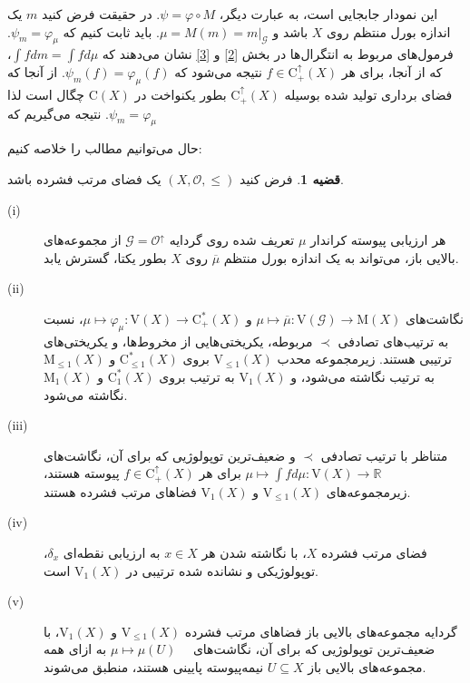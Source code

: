 \documentclass[12pt,a4paper]{article}
\theoremstyle{definition}
\theoremstyle{theorem}
\newtheorem{theorem}[definition]{قضیه}
\theoremstyle{definition}
\newcommand{\bR}{\mathbb{R}}
\newcommand{\cO}{\mathcal{O}}
\newcommand{\cG}{\mathcal{G}}
\newcommand{\rM}{\mathrm{M}}
\newcommand{\rC}{\mathrm{C}}
\begin{document}
این نمودار جابجایی است،  به عبارت دیگر، 
$ \psi=\varphi\circ M $.  در حقیقت فرض کنید 
$ m $
یک اندازه بورل منتظم روی 
$ X $
باشد و
$ \mu=M(m)=m|_{\cG} $.  باید ثابت کنیم که 
$ \psi_{m}=\varphi_{\mu} $.  فرمول‌های مربوط به انتگرال‌ها در بخش
\ref{2}
و
\ref{3}
نشان می‌دهند که
$ \int{f}dm=\int{f}d\mu $،  که از آنجا،  برای هر
$ f\in \rC_{+}^{\uparrow}(X) $
نتیجه می‌شود که
$ \psi_{m}(f)=\varphi_{\mu}(f) $.   از آنجا که فضای برداری تولید شده بوسیله 
$ \rC_{+}^{\uparrow}(X) $
بطور یکنواخت در 
$ \rC(X) $
چگال است لذا نتیجه می‌گیریم که 
$. \psi_{m}=\varphi_{\mu} $


حال می‌توانیم مطالب را خلاصه کنیم:
\begin{theorem}\label{5.4} 
فرض کنید 
$ (X,\cO,\leq) $
یک فضای مرتب فشرده باشد.  
\begin{description}
\item[(i)]
هر ارزیابی پیوسته کراندار 
$ \mu $
تعریف شده روی گردایه 
$ \cG=\cO^{\uparrow} $
از مجموعه‌های بالایی باز،  می‌تواند به یک اندازه بورل منتظم 
$ \overline{\mu} $
روی 
$ X $
بطور یکتا،  گسترش یابد.
\item[(ii)]
نگاشت‌های 
$ \mu\mapsto \overline{\mu}:\mathrm{V}(\cG)\rightarrow \rM(X) $
و
$ \mu\mapsto \varphi_{\mu}: \mathrm{V}(X)\rightarrow \rC_{+}^{*}(X) $،  نسبت به ترتیب‌های تصادفی 
$ \prec $
مربوطه،  یکریختی‌هایی از مخروط‌ها، و یکریختی‌های ترتیبی هستند.   زیرمجموعه محدب 
$ \mathrm{V}_{\leq 1}(X) $
بروی 
$ \rC_{\leq 1}^{*}(X) $
و
$ \rM_{\leq 1}(X) $
 به ترتیب نگاشته می‌شود،  و 
$ \mathrm{V}_{ 1}(X) $
به ترتیب بروی 
$ \rC_{ 1}^{*}(X) $
و
$ \rM_{ 1}(X) $
 نگاشته می‌شود.
\item[(iii)]
متناظر با ترتیب تصادفی  
$ \prec $
و ضعیف‌ترین توپولوژیی که برای آن،  نگاشت‌های
\linebreak
$ \mu\mapsto \int{f}d\mu: \mathrm{V}(X)\rightarrow \bR$
برای هر 
$ f\in  \rC_{ +}^{\uparrow}(X) $
پیوسته هستند،  زیرمجموعه‌های 
$ \mathrm{V}_{\leq 1}(X) $
و
$ \mathrm{V}_{ 1}(X) $
فضاهای مرتب فشرده هستند. 
\item[(iv)]
فضای مرتب فشرده 
$ X $،  با نگاشته‌ شدن هر
$ x\in X $
به ارزیابی نقطه‌ای 
$ \delta_{x} $، توپولوژیکی و نشانده شده ترتیبی در 
$ \mathrm{V}_{ 1}(X)  $
است.
\item[(v)]
گردایه  مجموعه‌های بالایی باز فضاهای مرتب فشرده 
$ \mathrm{V}_{\leq 1}(X) $
و
$ \mathrm{V}_{ 1}(X)  $، با 
  \linebreak
  ضعیف‌ترین توپولوژیی که برای آن،  نگاشت‌های
  \  \  
$ \mu \mapsto \mu(U) $
به ازای همه مجموعه‌های بالایی باز
$ U\subseteq X $
نیمه‌پیوسته پایینی هستند،  منطبق می‌شوند.
\end{description}
\end{theorem}
\end{document}
